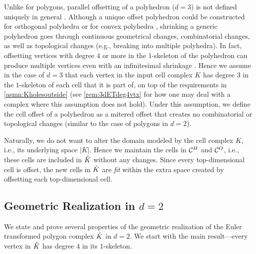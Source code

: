 Unlike for polygons, parallel offsetting of a polyhedron ($d=3$) is not defined uniquely in general \cite{BaEpGoVa2008}.
Although a unique offset polyhedron could be constructed for orthogonal polyhedra or for convex polyhedra \cite{BaEpGoVa2008,MaViPl2011}, shrinking a generic polyhedron goes through continuous geometrical changes, combinatorial changes, as well as topological changes (e.g., breaking into multiple polyhedra).
In fact, offsetting vertices with degree $4$ or more in the $1$-skeleton of the polyhedron can produce multiple vertices even with an infinitesimal shrinkage \cite{AuWa2013,AuWa2016}.
Hence we assume in the case of $d=3$ that each vertex in the input cell complex $K$ has degree $3$ in the $1$-skeleton of each cell that it is part of, on top of the requirements in \cref{asmn:Kholesoutside}
(see \cref{rem:3dETdeg4vtx} for how one may deal with a complex where this assumption does not hold).
Under this assumption, we define the cell offset of a polyhedron as a mitered offset that creates no combinatorial or topological changes (similar to the case of polygons in $d=2$).

Naturally, we do not want to alter the domain modeled by the cell complex $K$, i.e., its underlying space $|K|$.
Hence we maintain the cells in $\mathcal{C}^H$ and $\mathcal{C}^O$, i.e., these cells are included in $\hat{K}$ without any changes.
Since every top-dimensional cell is offset, the new cells in $\hat{K}$ are \emph{fit} within the extra space created by offsetting each top-dimensional cell.

\subsection{Geometric Realization in $d=2$} \label{ssec:rlzn2d}

  \addtocounter{thm}{-1}

We state and prove several properties of the geometric realization of the Euler transformed polygon complex $\hat{K}$ in $d=2$.
We start with the main result---every vertex in $\hat{K}$ has degree $4$ in its $1$-skeleton.

